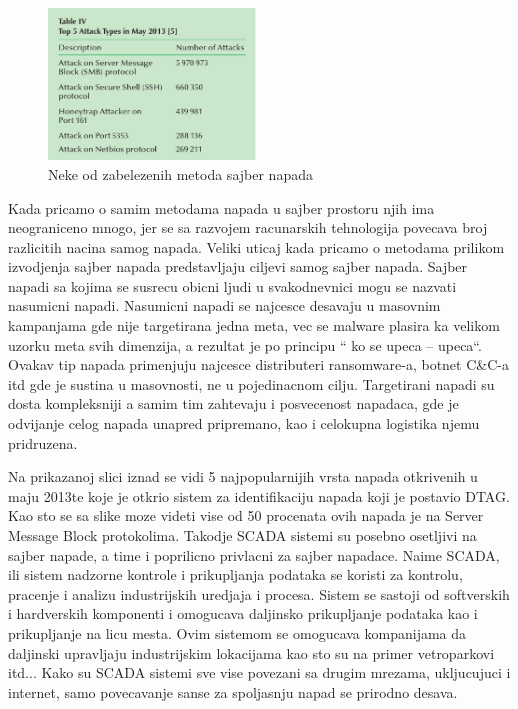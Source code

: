 \documentclass[a4paper]{article}
\begin{document}
{ \begin{figure}[h!]
  \centering
  \begin{center}
  \includegraphics[width=55mm]{slika2.jpg}
  \end{center}
  \caption{Neke od zabelezenih metoda sajber napada}
  \label{fig:vr1}
\end{figure}

Kada pricamo o samim metodama napada u sajber prostoru njih ima neograniceno mnogo, jer se sa razvojem racunarskih tehnologija povecava broj razlicitih nacina samog napada. Veliki uticaj kada pricamo o metodama prilikom izvodjenja sajber napada predstavljaju ciljevi samog sajber napada. Sajber napadi sa kojima se susrecu obicni ljudi u svakodnevnici mogu se nazvati nasumicni napadi. Nasumicni napadi se najcesce desavaju u masovnim kampanjama gde nije targetirana jedna meta, vec se malware plasira ka velikom uzorku meta svih dimenzija, a rezultat je po principu “ ko se upeca – upeca“. Ovakav tip napada primenjuju najcesce distributeri ransomware-a, botnet C&C-a itd gde je sustina u masovnosti, ne u pojedinacnom cilju.
Targetirani napadi su dosta kompleksniji a samim tim zahtevaju i posvecenost napadaca, gde je odvijanje celog napada unapred pripremano, kao i celokupna logistika njemu pridruzena.

Na prikazanoj slici iznad se vidi 5 najpopularnijih vrsta napada otkrivenih u maju 2013te koje je otkrio sistem za identifikaciju napada koji je postavio DTAG. Kao sto se sa slike moze videti vise od 50 procenata ovih napada je na Server Message Block protokolima.
Takodje SCADA sistemi su posebno osetljivi na sajber napade, a time i poprilicno privlacni za sajber napadace. Naime SCADA, ili sistem nadzorne kontrole i prikupljanja podataka se koristi za kontrolu, pracenje i analizu industrijskih uredjaja i procesa.
Sistem se sastoji od softverskih i hardverskih komponenti i omogucava daljinsko prikupljanje podataka kao i prikupljanje na licu mesta. Ovim sistemom se omogucava kompanijama da daljinski upravljaju industrijskim lokacijama kao sto su na primer vetroparkovi itd...
Kako su SCADA sistemi sve vise povezani sa drugim mrezama, ukljucujuci i internet, samo povecavanje sanse za spoljasnju napad se prirodno desava.


}
\end{document}
